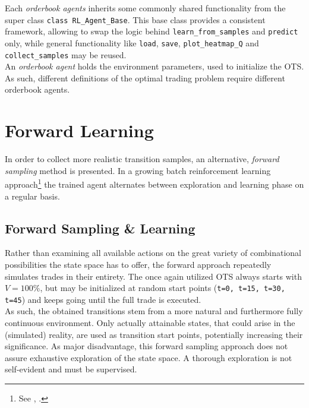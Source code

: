 Each \emph{orderbook agents} inherits some commonly shared functionality from the super class \lstinline!class RL_Agent_Base!. This base class provides a consistent framework, allowing to swap the logic behind \lstinline!learn_from_samples! and \lstinline!predict! only, while general functionality like \lstinline!load!, \lstinline!save!, \lstinline!plot_heatmap_Q! and \lstinline!collect_samples! may be reused.\\

An \emph{orderbook agent} holds the environment parameters, used to initialize the \ac{OTS}. As such, different definitions of the optimal trading problem require different orderbook agents.






\section{Forward Learning}
\label{chap:forwardlearning}
In order to collect more realistic transition samples, an alternative, \emph{forward sampling} method is presented. In a growing batch reinforcement learning approach\footnote{See , .} the trained agent alternates between exploration and learning phase on a regular basis.

\subsection{Forward Sampling \& Learning}
Rather than examining all available actions on the great variety of combinational possibilities the state space has to offer, the forward approach repeatedly simulates trades in their entirety. The once again utilized \ac{OTS} always starts with $V=100\%$, but may be initialized at random start points (\eg \lstinline!t=0, t=15, t=30, t=45!) and keeps going until the full trade is executed.\\

As such, the obtained transitions stem from a more natural and furthermore fully continuous environment. Only actually attainable states, that could arise in the (simulated) reality, are used as transition start points, potentially increasing their significance. As major disadvantage, this forward sampling approach does not assure exhaustive exploration of the state space. A thorough exploration is not self-evident and must be supervised.\\


